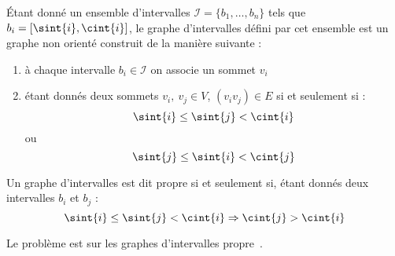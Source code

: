 
\begin{ndf}
    Étant donné un ensemble d'intervalles $\mathcal{I} = \{b_1, \dots, b_n\}$ tels que $b_i = [\sint{i},
    \cint{i}]$, le graphe d'intervalles défini par cet ensemble est un graphe non orienté construit de la
    manière suivante :
    \begin{enumerate}
        \item à chaque intervalle $b_i \in \mathcal{I}$ on associe un sommet $v_i$
        \item étant donnés deux sommets $v_i,\ v_j \in V$, $(v_iv_j) \in E$ si et seulement si : \[
                \sint{i} \leq \sint{j} < \cint{i}
            \]
            ou \[
                \sint{j} \leq \sint{i} < \cint{j}
            \]
    \end{enumerate}

    Un graphe d'intervalles est dit propre si et seulement si, étant donnés deux intervalles $b_i$
    et $b_j$ : \[
        \sint{i} \leq \sint{j} < \cint{i} \Rightarrow \cint{j} > \cint{i}
    \]
\end{ndf}

\begin{nthrm}
    Le problème \precolor est \npc sur les graphes d'intervalles
    propre~\cite{marx2006precoloring}.
\end{nthrm}

